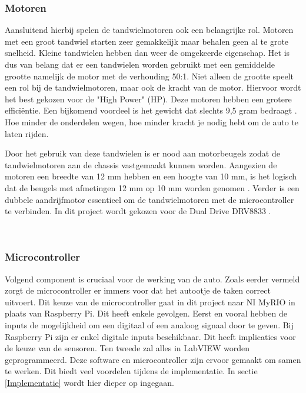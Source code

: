 \documentclass[a4paper,twoside,kulak]{kulakreport} %
\begin{document}
\subsubsection{Motoren}
Aansluitend hierbij spelen de tandwielmotoren ook een belangrijke rol. Motoren met een groot tandwiel starten zeer gemakkelijk maar behalen geen al te grote snelheid. Kleine tandwielen hebben dan weer de omgekeerde eigenschap. Het is dus van belang dat er een tandwielen worden gebruikt met een gemiddelde grootte namelijk de motor met de verhouding 50:1. Niet alleen de grootte speelt een rol bij de tandwielmotoren, maar ook de kracht van de motor. Hiervoor wordt het best gekozen voor de "High Power" (HP). Deze motoren hebben een grotere efficiëntie. Een bijkomend voordeel is het gewicht dat slechts 9,5 gram bedraagt \cite{MicroMetalGearMotor50:1HP}. %
Hoe minder de onderdelen wegen, hoe minder kracht je nodig hebt om de auto te laten rijden. 

Door het gebruik van deze tandwielen is er nood aan motorbeugels zodat de tandwielmotoren aan de chassis  vastgemaakt kunnen worden. Aangezien de motoren een breedte van 12 mm hebben en een hoogte van 10 mm, is het logisch dat de beugels met afmetingen 12 mm op 10 mm worden genomen \cite{MicroMetalGearMotorBeugel}.
Verder is een dubbele aandrijfmotor essentieel om de tandwielmotoren met de microcontroller te verbinden. In dit project wordt gekozen voor de Dual Drive DRV8833 \cite{DualDriveDRV8833}. 
\label{Motoren}

~
\subsubsection{Microcontroller}

Volgend component is cruciaal voor de werking van de auto. Zoals eerder vermeld zorgt de microcontroller er immers voor dat het autootje de taken correct uitvoert. Dit keuze van de microcontroller gaat in dit project naar NI MyRIO in plaats van Raspberry Pi. Dit heeft enkele gevolgen. 
Eerst en vooral hebben de inputs de mogelijkheid om een digitaal of een analoog signaal door te geven. Bij Raspberry Pi zijn er enkel digitale inputs beschikbaar. Dit heeft implicaties voor de keuze van de sensoren. Ten tweede zal alles in LabVIEW worden geprogrammeerd. Deze software en microcontroller zijn ervoor gemaakt om samen te werken. Dit biedt veel voordelen tijdens de implementatie. In sectie \ref{Implementatie} wordt hier dieper op ingegaan. %
\end{document}

